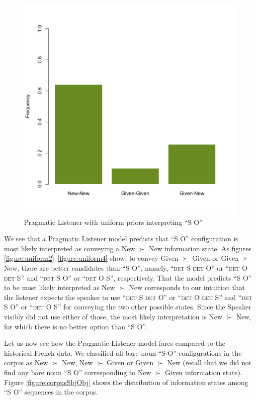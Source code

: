 \documentclass[output=paper,modfonts,nonflat]{langsci/langscibook}
\begin{document}
\begin{figure}
\includegraphics[scale = 0.45]{figures/plotPragmaticListenerSbjObjUniform}
\caption{Pragmatic Listener with uniform priors interpreting ``S O''}\label{figure:uniform5}
\end{figure}

We see that a Pragmatic Listener model predicts that ``S O'' configuration is most likely interpreted as conveying a New $\succ$ New information state. As figures \ref{figure:uniform2}--\ref{figure:uniform4} show, to convey Given $\succ$ Given or Given $\succ$ New, there are better candidates than ``S O'', namely, ``{\scshape det} S {\scshape det} O'' or ``{\scshape det} O {\scshape det} S'' and ``{\scshape det} S O'' or ``{\scshape det} O S'', respectively. That the model predicts ``S O'' to be most likely interpreted as New $\succ$ New corresponds to our intuition that the listener expects the speaker to use ``{\scshape det} S {\scshape det} O'' or ``{\scshape det} O {\scshape det} S'' and ``{\scshape det} S O'' or ``{\scshape det} O S'' for conveying the two other possible states. Since the Speaker visibly did not use either of those, the most likely interpretation is New $\succ$ New, for which there is no better option than ``S O''.

Let us now see how the Pragmatic Listener model fares compared to the historical French data. We classified all bare noun ``S O'' configurations in the corpus as New $\succ$ New, New $\succ$ Given or Given $\succ$ New (recall that we did not find any bare noun ``S O'' corresponding to New $\succ$ Given information state). Figure \ref{figure:corpusSbjObj} shows the distribution of information states among ``S O'' sequences in the corpus.
\end{document}
